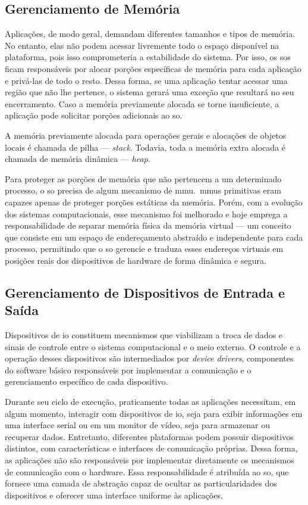 \subsection{Gerenciamento de Memória}

Aplicações, de modo geral, demandam diferentes tamanhos e tipos de memória. No entanto, elas não podem acessar livremente todo o espaço disponível na plataforma,
pois isso comprometeria a estabilidade do sistema. Por isso, os \glspl{so} ficam responsáveis por alocar porções específicas de memória para cada aplicação e privá-las de
todo o resto. Dessa forma, se uma aplicação tentar acessar uma região que não lhe pertence, o sistema gerará uma exceção que resultará no seu encerramento.
Caso a memória previamente alocada se torne insuficiente, a aplicação pode solicitar porções adicionais ao \gls{so}.

A memória previamente alocada para operações gerais e alocações de objetos locais é chamada de pilha --- \textit{stack}.
Todavia, toda a memória extra alocada é chamada de memória dinâmica --- \textit{heap}.

Para proteger as porções de memória que não pertencem a um determinado processo, o \gls{so} precisa de algum mecanismo de \gls{mmu}.~\Glspl{mmu} primitivas eram capazes
apenas de proteger porções estáticas da memória. Porém, com a evolução dos sistemas computacionais, esse mecanismo foi melhorado e hoje emprega a responsabilidade de
separar memória física da memória virtual — um conceito que consiste em um espaço de endereçamento abstraído e independente para cada processo, permitindo que o \gls{so}
gerencie e traduza esses endereços virtuais em posições reais dos dispositivos de hardware de forma dinâmica e segura.

\subsection{Gerenciamento de Dispositivos de Entrada e Saída}

Dispositivos de \gls{io} constituem mecanismos que viabilizam a troca de dados e sinais de controle entre o sistema computacional e o meio externo.
O controle e a operação desses dispositivos são intermediados por \textit{device drivers}, componentes do software básico responsáveis por implementar a comunicação e
o gerenciamento específico de cada dispositivo.

Durante seu ciclo de execução, praticamente todas as aplicações necessitam, em algum momento, interagir com dispositivos de \gls{io}, seja para exibir informações em
uma interface serial ou em um monitor de vídeo, seja para armazenar ou recuperar dados. Entretanto, diferentes plataformas podem possuir dispositivos distintos, com características
e interfaces de comunicação próprias. Dessa forma, as aplicações não são responsáveis por implementar diretamente os mecanismos de comunicação com o hardware. Essa responsabilidade
é atribuída ao \gls{so}, que fornece uma camada de abstração capaz de ocultar as particularidades dos dispositivos e oferecer uma interface uniforme às aplicações.

